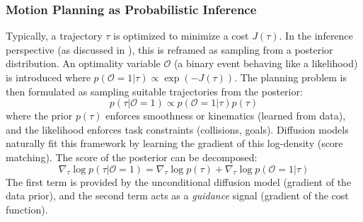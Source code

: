 \subsubsection{Motion Planning as Probabilistic Inference}
Typically, a trajectory \(\tau\) is optimized to minimize a cost \(J(\tau)\). In the
inference perspective (as discussed in \cite{carvalho2023motion}), this is reframed as sampling from a posterior
distribution. An optimality variable \(\mathcal{O}\) (a binary event
behaving like a likelihood) is introduced where
\(p(\mathcal{O}=1|\tau) \propto \exp(-J(\tau))\). The planning problem
is then formulated as sampling suitable trajectories from the posterior:
\[ p(\tau | \mathcal{O}=1) \propto p(\mathcal{O}=1 | \tau) p(\tau) \]
where the prior \(p(\tau)\) enforces smoothness or kinematics (learned
from data), and the likelihood enforces task constraints (collisions,
goals). Diffusion models naturally fit this framework by learning the
gradient of this log-density (score matching). The score of the
posterior can be decomposed:
\[ \nabla_\tau \log p(\tau | \mathcal{O}=1) = \nabla_\tau \log p(\tau) + \nabla_\tau \log p(\mathcal{O}=1 | \tau) \]
The first term is provided by the unconditional diffusion model
(gradient of the data prior), and the second term acts as a
\emph{guidance} signal (gradient of the cost function).


